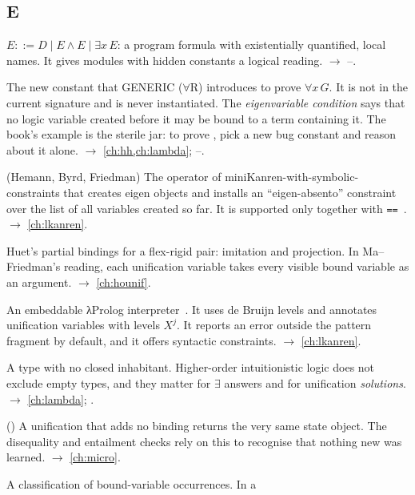 \subsection*{E}
\begin{glossarylist}
\item[E-formula] $E ::= D\mid E\wedge E\mid\exists x\,E$: a program formula with existentially quantified, local
  names. It gives modules with hidden constants a logical reading. $\rightarrow$ --.
\item[Eigenvariable, scoped constant] The new constant that GENERIC ($\forall$R) introduces to prove
  $\forall x\,G$. It is not in the current signature and is never instantiated. The \emph{eigenvariable
  condition} says that no logic variable created before it may be bound to a term containing it. The book's
  example is the sterile jar: to prove , pick a new bug constant and reason
  about it alone. $\rightarrow$ \cref{ch:hh,ch:lambda}; --.
\item[\texttt{eigen}] (Hemann, Byrd, Friedman) The operator of miniKanren-with-symbolic-constraints that creates
  eigen objects and installs an \enquote{eigen-absento} constraint over the list of all variables created so far.
  It is supported only together with \texttt{==}~\cite{HemannByrdFriedman2013}. $\rightarrow$ \cref{ch:lkanren}.
\item[Elementary substitution] Huet's partial bindings for a flex-rigid pair: imitation and projection. In
  Ma--Friedman's reading, each unification variable takes every visible bound variable as an argument.
  $\rightarrow$ \cref{ch:hounif}.
\item[ELPI] An embeddable λProlog interpreter~\cite{DunchevEtAl2015}. It uses de Bruijn levels and annotates
  unification variables with levels $X^j$. It reports an error outside the pattern fragment by default, and it
  offers syntactic constraints. $\rightarrow$ \cref{ch:lkanren}.
\item[Empty type] A type with no closed inhabitant. Higher-order intuitionistic logic does not exclude empty types,
  and they matter for $\exists$ answers and for unification \emph{solutions}. $\rightarrow$ \cref{ch:lambda};
  .
\item[\texttt{eq?}-invariant] (\micro{}) A unification that adds no binding returns the very same state object.
  The disequality and entailment checks rely on this to recognise that nothing new was learned.
  $\rightarrow$ \cref{ch:micro}.
\item[Essentially universal / essentially existential] A classification of bound-variable occurrences. In a

\end{glossarylist}
